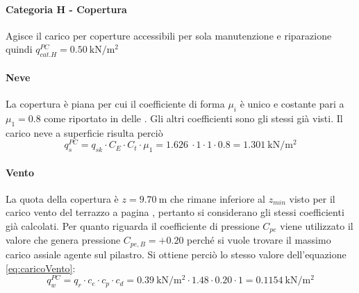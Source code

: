 \paragraph*{Categoria H - Copertura} Agisce il carico per coperture accessibili per sola manutenzione e riparazione quindi $q_{cat. H}^{PC} = \SI{0.50}{\kilo\newton\per\square\meter}$ 
\paragraph*{Neve} La copertura è piana per cui il coefficiente di forma $\mu_i$ è unico e costante pari a $\mu_1=0.8$ come riportato in  delle . 
Gli altri coefficienti sono gli stessi già visti.
Il carico neve a superficie risulta perciò
\[
	q_s^{PC} = q_{sk} \cdot C_E \cdot C_t \cdot \mu_1 = \SI{1.626}{} \cdot 1 \cdot 1 \cdot 0.8 = \SI{1.301}{\kilo\newton\per\square\meter}
\]
\paragraph*{Vento} La quota della copertura è $z=\SI{9.70}{\meter}$ che rimane inferiore al $z_{min}$ visto per il carico vento del terrazzo a pagina \pageref{cap:ventoTerrazzo}, pertanto si considerano gli stessi coefficienti già calcolati.
Per quanto riguarda il coefficiente di pressione $C_{pe}$ viene utilizzato il valore che genera pressione $C_{pe,B}=+0.20$ perché si vuole trovare il massimo carico assiale agente sul pilastro.
Si ottiene perciò lo stesso valore dell'equazione \eqref{eq:caricoVento}:
\[
	q_w^{PC} = q_r \cdot c_e \cdot c_p \cdot c_d = \SI{0.39}{\kilo\newton\per\square\meter}\cdot 1.48 \cdot  0.20 \cdot 1= \SI{0.1154}{\kilo\newton\per\square\meter}
\]
